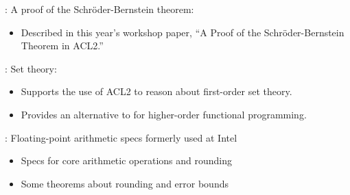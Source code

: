 
\begin{frame}

\newlibtitle

:
A proof of the Schr{\"o}der-Bernstein theorem:
\begin{itemize}
\item Described in this year's workshop paper,
      ``A Proof of the Schr{\"o}der-Bernstein Theorem in {ACL2}.''
\end{itemize}

\end{frame}


\begin{frame}

\newlibtitle

:
Set theory:
\begin{itemize}
\item Supports the use of ACL2 to reason about first-order set theory.
\item Provides an alternative to  for higher-order
      functional programming.
\end{itemize}

\end{frame}


\begin{frame}

\newlibtitle

:
Floating-point arithmetic specs formerly used at Intel
\begin{itemize}
\item Specs for core arithmetic operations and rounding
\item Some theorems about rounding and error bounds
\end{itemize}

\end{frame}


